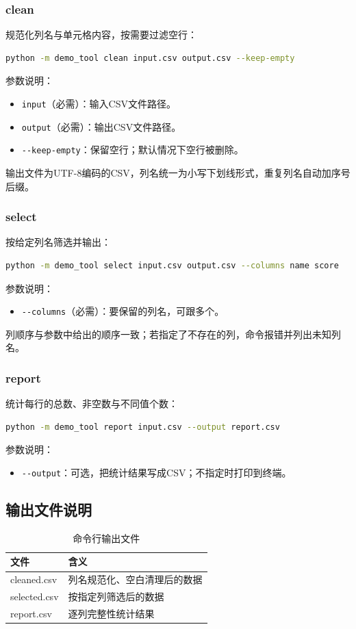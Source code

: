 \subsubsection{clean}
\label{ssec:cli_clean}
规范化列名与单元格内容，按需要过滤空行：
\begin{lstlisting}[language=bash,style=blockstyle]
python -m demo_tool clean input.csv output.csv --keep-empty
\end{lstlisting}
参数说明：
\begin{itemize}
    \item \lstinline|input|（必需）：输入CSV文件路径。
    \item \lstinline|output|（必需）：输出CSV文件路径。
    \item \lstinline|--keep-empty|：保留空行；默认情况下空行被删除。
\end{itemize}
输出文件为UTF-8编码的CSV，列名统一为小写下划线形式，重复列名自动加序号后缀。

\subsubsection{select}
\label{ssec:cli_select}
按给定列名筛选并输出：
\begin{lstlisting}[language=bash,style=blockstyle]
python -m demo_tool select input.csv output.csv --columns name score
\end{lstlisting}
参数说明：
\begin{itemize}
    \item \lstinline|--columns|（必需）：要保留的列名，可跟多个。
\end{itemize}
列顺序与参数中给出的顺序一致；若指定了不存在的列，命令报错并列出未知列名。

\subsubsection{report}
\label{ssec:cli_report}
统计每行的总数、非空数与不同值个数：
\begin{lstlisting}[language=bash,style=blockstyle]
python -m demo_tool report input.csv --output report.csv
\end{lstlisting}
参数说明：
\begin{itemize}
    \item \lstinline|--output|：可选，把统计结果写成CSV；不指定时打印到终端。
\end{itemize}

\subsection{输出文件说明}
\label{ssec:cli_outputs}
\begin{table}[H]
\centering
\begin{tabular}{ll}
\toprule
\textbf{文件} & \textbf{含义} \\
\midrule
cleaned.csv & 列名规范化、空白清理后的数据 \\
selected.csv & 按指定列筛选后的数据 \\
report.csv & 逐列完整性统计结果 \\
\bottomrule
\end{tabular}
\caption{命令行输出文件}
\end{table}

